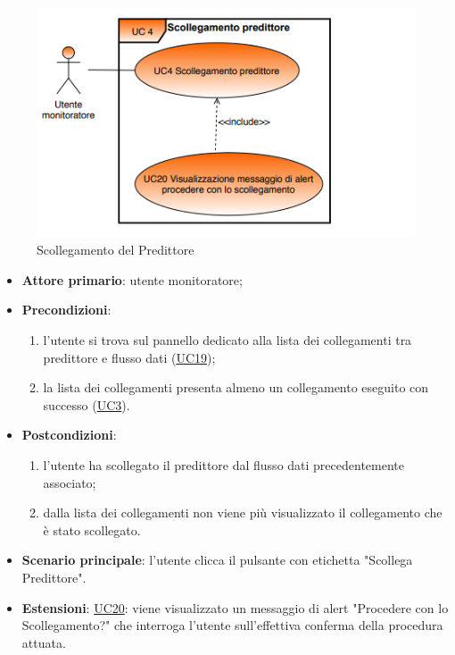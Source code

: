 		\begin{figure}[H]
		\centering
		\includegraphics[scale=0.80]{../Analisi_dei_requisiti/img/Diagrammi_UML/UC4_Scollegamento_predittore.png}
		\caption{Scollegamento del Predittore}
		\end{figure}	

		\begin{itemize}
			\item\textbf{Attore primario}: utente monitoratore;
			\item\textbf{Precondizioni}:
				\begin{enumerate}
					\item l'utente si trova sul pannello dedicato alla lista dei collegamenti tra predittore e flusso dati (\hyperref[par:UC19]{UC19});
					\item la lista dei collegamenti presenta almeno un collegamento eseguito con successo (\hyperref[par:UC3]{UC3}).
				\end{enumerate}
			\item\textbf{Postcondizioni}:
				\begin{enumerate}
					\item l’utente ha scollegato il predittore dal flusso dati precedentemente associato;
					\item dalla lista dei collegamenti non viene più visualizzato il collegamento che è stato scollegato.
				\end{enumerate}
			\item\textbf{Scenario principale}: l'utente clicca il pulsante con etichetta "Scollega Predittore".
			\item\textbf{Estensioni}: \hyperref[par:UC20]{UC20}: viene visualizzato un messaggio di alert "Procedere con lo Scollegamento?" che interroga l'utente sull'effettiva conferma della procedura attuata.
		\end{itemize}	


